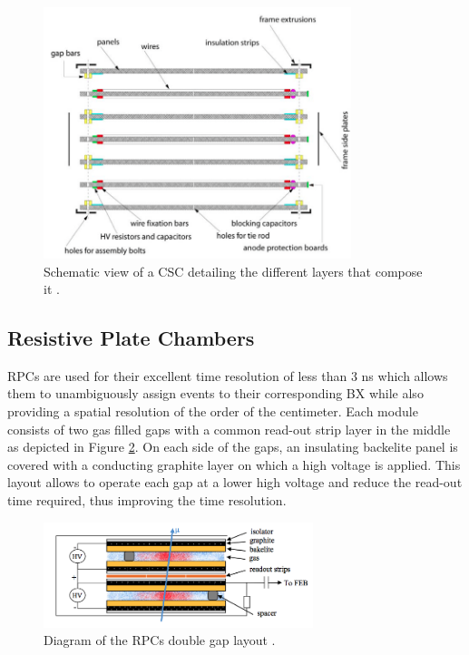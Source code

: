       \begin{figure}[h!]
        \centering
        \includegraphics[width=0.8\textwidth]{img/I-3-cms/csc.png}
        \caption{Schematic view of a CSC detailing the different layers that compose it \cite{1748-0221-3-08-S08004}.}
        \label{fig:I-3-csc}
      \end{figure}

  	\subsection{Resistive Plate Chambers}

      RPCs are used for their excellent time resolution of less than 3 ns which allows them to unambiguously assign events to their corresponding BX while also providing a spatial resolution of the order of the centimeter. Each module consists of two gas filled gaps with a common read-out strip layer in the middle as depicted in Figure \ref{fig:I-3-rpc}. On each side of the gaps, an insulating backelite panel is covered with a conducting graphite layer on which a high voltage is applied. This layout allows to operate each gap at a lower high voltage and reduce the read-out time required, thus improving the time resolution. \\

      \begin{figure}[h!]
        \centering
        \includegraphics[width=0.7\textwidth]{img/I-3-cms/rpc.png}
        \caption{Diagram of the RPCs double gap layout \cite{1748-0221-3-08-S08004}.}
        \label{fig:I-3-rpc}
      \end{figure}

